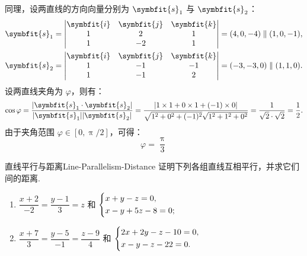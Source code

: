 \begin{solution}
    同理，设两直线的方向向量分别为 $\symbfit{s}_1$ 与 $\symbfit{s}_2$：
    \begin{equation}
        \begin{aligned}
            \symbfit{s}_1 & = \begin{vmatrix} \symbfit{i} & \symbfit{j} & \symbfit{k} \\ 1 & 2 & 1 \\ 1 & -2 & 1 \end{vmatrix} = (4, 0, -4) \parallel (1, 0, -1),   \\
            \symbfit{s}_2 & = \begin{vmatrix} \symbfit{i} & \symbfit{j} & \symbfit{k} \\ 1 & -1 & -1 \\ 1 & -1 & 2 \end{vmatrix} = (-3, -3, 0) \parallel (1, 1, 0).
        \end{aligned}
    \end{equation}
    设两直线夹角为 $\varphi$，则有：
    \begin{equation}
        \cos \varphi = \frac{|\symbfit{s}_1 \cdot \symbfit{s}_2|}{|\symbfit{s}_1| |\symbfit{s}_2|} = \frac{|1 \times 1 + 0 \times 1 + (-1) \times 0|}{\sqrt{1^2 + 0^2 + (-1)^2} \sqrt{1^2 + 1^2 + 0^2}} = \frac{1}{\sqrt{2} \cdot \sqrt{2}} = \frac{1}{2}.
    \end{equation}
    由于夹角范围 $\varphi \in [0, \uppi/2]$，可得：
    \begin{equation}
        \boxed{\varphi = \frac{\uppi}{3}}
    \end{equation}
\end{solution}


\begin{problem}{直线平行与距离}{Line-Parallelism-Distance}
    证明下列各组直线互相平行，并求它们间的距离.
    \begin{enumerate}
        \item $\dfrac{x+2}{-2} = \dfrac{y-1}{3} = z$ 和 $\begin{dcases} x + y - z = 0, \\ x - y + 5z - 8 = 0; \end{dcases}$
        \item $\dfrac{x+7}{3} = \dfrac{y-5}{-1} = \dfrac{z-9}{4}$ 和 $\begin{dcases} 2x + 2y - z - 10 = 0, \\ x - y - z - 22 = 0. \end{dcases}$
    \end{enumerate}
\end{problem}

